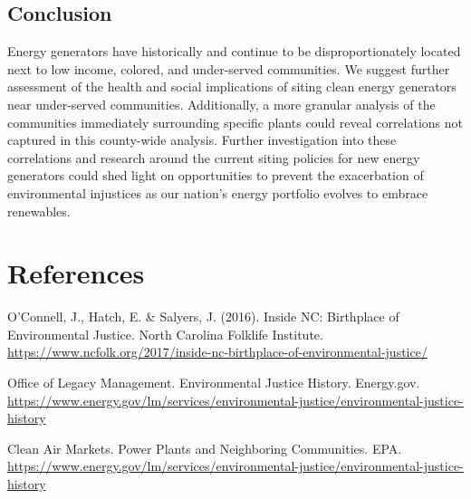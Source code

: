 \documentclass[
  12pt,
]{article}
\begin{document}
\hypertarget{conclusion}{%
\subsection{Conclusion}\label{conclusion}}

Energy generators have historically and continue to be
disproportionately located next to low income, colored, and under-served
communities. We suggest further assessment of the health and social
implications of siting clean energy generators near under-served
communities. Additionally, a more granular analysis of the communities
immediately surrounding specific plants could reveal correlations not
captured in this county-wide analysis. Further investigation into these
correlations and research around the current siting policies for new
energy generators could shed light on opportunities to prevent the
exacerbation of environmental injustices as our nation's energy
portfolio evolves to embrace renewables.

\newpage

\hypertarget{references}{%
\section{References}\label{references}}

O'Connell, J., Hatch, E. \& Salyers, J. (2016). Inside NC: Birthplace of
Environmental Justice. North Carolina Folklife Institute.
\url{https://www.ncfolk.org/2017/inside-nc-birthplace-of-environmental-justice/}

Office of Legacy Management. Environmental Justice History. Energy.gov.
\url{https://www.energy.gov/lm/services/environmental-justice/environmental-justice-history}

Clean Air Markets. Power Plants and Neighboring Communities. EPA.
\url{https://www.energy.gov/lm/services/environmental-justice/environmental-justice-history}
\end{document}
